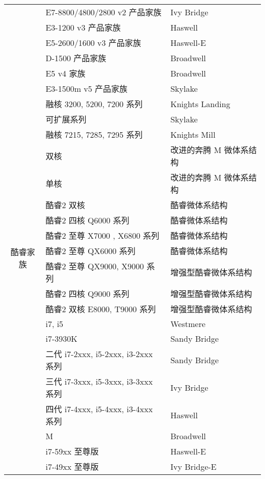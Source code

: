 \begin{multicols}{2}
\begin{table}[H]
\begin{tabular}{|c|l|l|}
\cline{2-3}          & E7-8800/4800/2800 v2 产品家族 & Ivy Bridge \\
\cline{2-3}          & E3-1200 v3 产品家族 & Haswell \\
\cline{2-3}          & E5-2600/1600 v3 产品家族 & Haswell-E \\
\cline{2-3}          & D-1500 产品家族 & Broadwell \\
\cline{2-3}          & E5 v4 家族 & Broadwell \\
\cline{2-3}          & E3-1500m v5 产品家族 & Skylake \\
\cline{2-3}          & 融核 3200, 5200, 7200 系列 & Knights Landing \\
\cline{2-3}          & 可扩展系列 & Skylake \\
\cline{2-3}          & 融核 7215, 7285, 7295 系列 & Knights Mill \\
    \hline
    \multirow{12}[42]{*}{酷睿家族} & 双核    & 改进的奔腾 M 微体系结构 \\
\cline{2-3}          & 单核    & 改进的奔腾 M 微体系结构 \\
\cline{2-3}          & 酷睿2 双核 & 酷睿微体系结构 \\
\cline{2-3}          & 酷睿2 四核 Q6000 系列 & 酷睿微体系结构 \\
\cline{2-3}          & 酷睿2 至尊 X7000 , X6800 系列 & 酷睿微体系结构 \\
\cline{2-3}          & 酷睿2 至尊 QX6000 系列 & 酷睿微体系结构 \\
\cline{2-3}          & 酷睿2 至尊 QX9000, X9000 系列 & 增强型酷睿微体系结构 \\
\cline{2-3}          & 酷睿2 四核 Q9000 系列 & 增强型酷睿微体系结构 \\
\cline{2-3}          & 酷睿2 双核 E8000, T9000 系列 & 增强型酷睿微体系结构 \\
\cline{2-3}          & i7, i5 & Westmere \\
\cline{2-3}          & i7-3930K & Sandy Bridge \\
\cline{2-3}          & 二代 i7-2xxx, i5-2xxx, i3-2xxx 系列 & Sandy Bridge \\
\cline{2-3}          & 三代 i7-3xxx, i5-3xxx, i3-3xxx 系列 & Ivy Bridge \\
\cline{2-3}          & 四代 i7-4xxx, i5-4xxx, i3-4xxx 系列 & Haswell \\
\cline{2-3}          & M     & Broadwell \\
\cline{2-3}          & i7-59xx 至尊版 & Haswell-E \\
\cline{2-3}          & i7-49xx 至尊版 & Ivy Bridge-E \\

\end{tabular}
\end{table}
\end{multicols}

